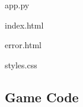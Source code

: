 \documentclass[a4paper, 11pt]{report}
\begin{document}
app.py


index.html


error.html


styles.css



\subsection{Game Code}
\end{document}

